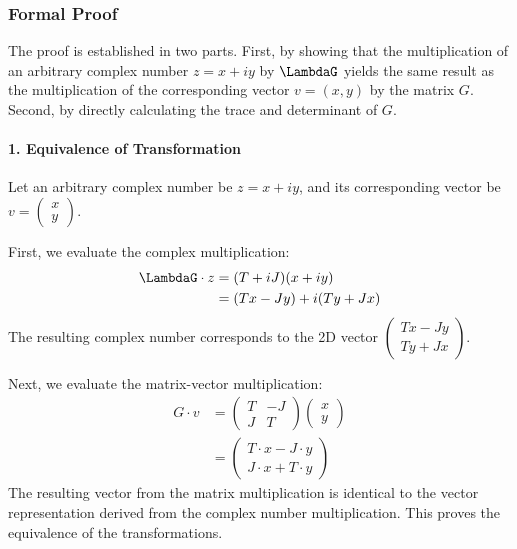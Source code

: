 \subsubsection*{Formal Proof}
The proof is established in two parts. First, by showing that the multiplication of an arbitrary complex number $z = x+iy$ by $\LambdaG$ yields the same result as the multiplication of the corresponding vector $v = (x, y)$ by the matrix $G$. Second, by directly calculating the trace and determinant of $G$.

\paragraph{1. Equivalence of Transformation}
Let an arbitrary complex number be $z = x+iy$, and its corresponding vector be $v = \begin{pmatrix} x \\ y \end{pmatrix}$.

First, we evaluate the complex multiplication:
\begin{align*}
    \LambdaG \cdot z &= (T + iJ)(x + iy) \\
    &= (Tx - Jy) + i(Ty + Jx)
\end{align*}
The resulting complex number corresponds to the 2D vector $\begin{pmatrix} Tx - Jy \\ Ty + Jx \end{pmatrix}$.

Next, we evaluate the matrix-vector multiplication:
\begin{align*}
    G \cdot v &= \begin{pmatrix} T & -J \\ J & T \end{pmatrix} \begin{pmatrix} x \\ y \end{pmatrix} \\
    &= \begin{pmatrix} T \cdot x - J \cdot y \\ J \cdot x + T \cdot y \end{pmatrix}
\end{align*}
The resulting vector from the matrix multiplication is identical to the vector representation derived from the complex number multiplication. This proves the equivalence of the transformations.

